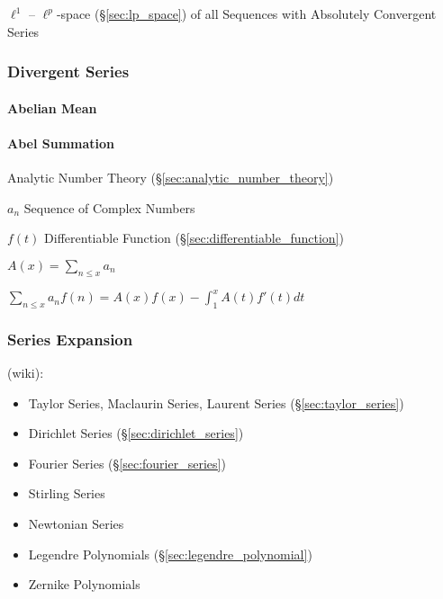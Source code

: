 $\ell^1$ -- $\ell^p$-space (\S\ref{sec:lp_space}) of all Sequences with
Absolutely Convergent Series



\subsubsection{Divergent Series}\label{sec:divergent_series}

\paragraph{Abelian Mean}\label{sec:abelian_mean}\hfill

\paragraph{Abel Summation}\label{sec:abel_summation}\hfill

Analytic Number Theory (\S\ref{sec:analytic_number_theory})

$a_n$ Sequence of Complex Numbers

$f(t)$ Differentiable Function (\S\ref{sec:differentiable_function})

$A(x) = \sum_{n \leq x} a_n$

$\sum_{n \leq x} a_n f(n) = A(x)f(x) - \int_1^x A(t)f'(t) dt$



\subsubsection{Series Expansion}\label{sec:series_expansion}

(wiki):
\begin{itemize}
  \item Taylor Series, Maclaurin Series, Laurent Series
    (\S\ref{sec:taylor_series})
  \item Dirichlet Series (\S\ref{sec:dirichlet_series})
  \item Fourier Series (\S\ref{sec:fourier_series})
  \item Stirling Series
  \item Newtonian Series
  \item Legendre Polynomials (\S\ref{sec:legendre_polynomial})
  \item Zernike Polynomials
\end{itemize}



